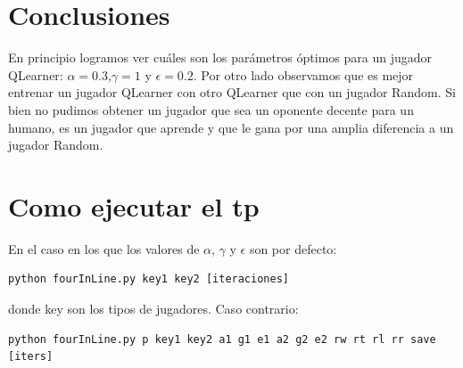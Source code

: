 \documentclass[10pt, a4paper]{article}
\begin{document}

\section{Conclusiones}
En principio logramos ver cuáles son los parámetros óptimos para un jugador QLearner: $\alpha=0.3$,$\gamma=1$ y $\epsilon=0.2$.
Por otro lado observamos que es mejor entrenar un jugador QLearner con otro QLearner que con un jugador Random.
Si bien no pudimos obtener un jugador que sea un oponente decente para un humano, es un jugador que aprende y que le gana por una amplia diferencia a un jugador Random.


\section{Como ejecutar el tp}


En el caso en los que los valores de $\alpha$, $\gamma$ y $\epsilon$ son por defecto:
\begin{lstlisting}
python fourInLine.py key1 key2 [iteraciones]  
\end{lstlisting}
donde key son los tipos de jugadores. Caso contrario: \\
\begin{lstlisting}
python fourInLine.py p key1 key2 a1 g1 e1 a2 g2 e2 rw rt rl rr save [iters]
\end{lstlisting}
\end{document}
